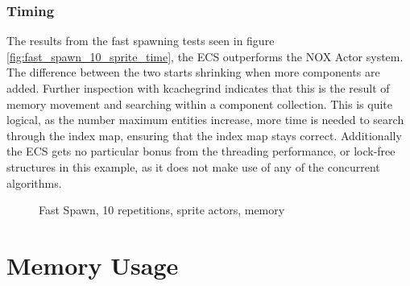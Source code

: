 \subsubsection{Timing}
The results from the fast spawning tests seen in figure \ref{fig:fast_spawn_10_sprite_time},
the ECS outperforms the NOX Actor system.
The difference between the two starts shrinking when more components are added.
Further inspection with kcachegrind indicates that this is the result of memory movement and searching within a component collection.
This is quite logical, as the number maximum entities increase, more time is needed
to search through the index map, ensuring that the index map stays correct.
Additionally the ECS gets no particular bonus from the threading performance, or lock-free structures
in this example, as it does not make use of any of the concurrent algorithms.
\begin{figure}[H]
\centering
{}
\caption[Fast Spawning, ECS versus Actor, 10 repetitions, sprites, memory]{Fast Spawn, 10 repetitions, sprite actors, memory}
\label{fig:fast_spawn_10_sprite_peak_memory}
\end{figure}

\section{Memory Usage}
